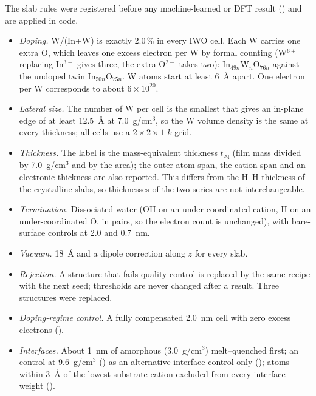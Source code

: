 The slab rules were registered before any machine-learned or DFT result () and are applied in code.
\begin{itemize}
\item \emph{Doping.} W/(In+W) is exactly 2.0\,\% in every IWO cell. Each W carries one extra O, which leaves one
excess electron per W by formal counting (W$^{6+}$ replacing In$^{3+}$ gives three, the extra O$^{2-}$ takes two):
In$_{49n}$W$_n$O$_{76n}$ against the undoped twin In$_{50n}$O$_{75n}$. W atoms start at least 6~\AA{} apart. One
electron per W corresponds to about $6\times10^{20}$\cmcu{}.
\item \emph{Lateral size.} The number of W per cell is the smallest that gives an in-plane edge of at least 12.5~\AA{}
at 7.0~g/cm$^3$, so the W volume density is the same at every thickness; all cells use a $2\times2\times1$ $k$ grid.
\item \emph{Thickness.} The label is the mass-equivalent thickness $t_{\mathrm{eq}}$ (film mass divided by
7.0~g/cm$^3$ and by the area); the outer-atom span, the cation span and an electronic thickness are also reported. This
differs from the H--H thickness of the crystalline slabs, so thicknesses of the two series are not interchangeable.
\item \emph{Termination.} Dissociated water (OH on an under-coordinated cation, H on an under-coordinated O, in pairs,
so the electron count is unchanged), with bare-surface controls at 2.0 and 0.7~nm.
\item \emph{Vacuum.} 18~\AA{} and a dipole correction along $z$ \citep{Bengtsson1999} for every slab.
\item \emph{Rejection.} A structure that fails quality control is replaced by the same recipe with the next seed;
thresholds are never changed after a result. Three structures were replaced.
\item \emph{Doping-regime control.} A fully compensated 2.0~nm cell with zero excess electrons ().
\item \emph{Interfaces.} About 1~nm of amorphous \AlO{} (3.0~g/cm$^3$) melt--quenched first; an \HfO{} control at
9.6~g/cm$^3$ () as an alternative-interface control only (); atoms within 3~\AA{} of the lowest
substrate cation excluded from every interface weight ().
\end{itemize}

